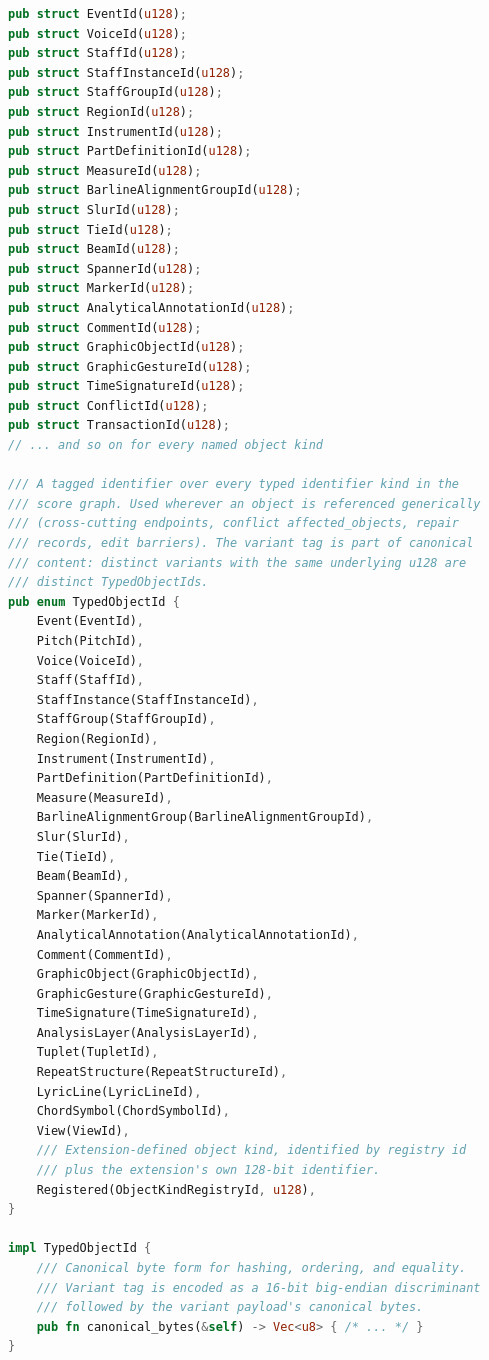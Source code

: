 \documentclass[11pt,letterpaper]{report}
\begin{document}
\begin{lstlisting}[language=Rust]
pub struct EventId(u128);
pub struct VoiceId(u128);
pub struct StaffId(u128);
pub struct StaffInstanceId(u128);
pub struct StaffGroupId(u128);
pub struct RegionId(u128);
pub struct InstrumentId(u128);
pub struct PartDefinitionId(u128);
pub struct MeasureId(u128);
pub struct BarlineAlignmentGroupId(u128);
pub struct SlurId(u128);
pub struct TieId(u128);
pub struct BeamId(u128);
pub struct SpannerId(u128);
pub struct MarkerId(u128);
pub struct AnalyticalAnnotationId(u128);
pub struct CommentId(u128);
pub struct GraphicObjectId(u128);
pub struct GraphicGestureId(u128);
pub struct TimeSignatureId(u128);
pub struct ConflictId(u128);
pub struct TransactionId(u128);
// ... and so on for every named object kind

/// A tagged identifier over every typed identifier kind in the
/// score graph. Used wherever an object is referenced generically
/// (cross-cutting endpoints, conflict affected_objects, repair
/// records, edit barriers). The variant tag is part of canonical
/// content: distinct variants with the same underlying u128 are
/// distinct TypedObjectIds.
pub enum TypedObjectId {
    Event(EventId),
    Pitch(PitchId),
    Voice(VoiceId),
    Staff(StaffId),
    StaffInstance(StaffInstanceId),
    StaffGroup(StaffGroupId),
    Region(RegionId),
    Instrument(InstrumentId),
    PartDefinition(PartDefinitionId),
    Measure(MeasureId),
    BarlineAlignmentGroup(BarlineAlignmentGroupId),
    Slur(SlurId),
    Tie(TieId),
    Beam(BeamId),
    Spanner(SpannerId),
    Marker(MarkerId),
    AnalyticalAnnotation(AnalyticalAnnotationId),
    Comment(CommentId),
    GraphicObject(GraphicObjectId),
    GraphicGesture(GraphicGestureId),
    TimeSignature(TimeSignatureId),
    AnalysisLayer(AnalysisLayerId),
    Tuplet(TupletId),
    RepeatStructure(RepeatStructureId),
    LyricLine(LyricLineId),
    ChordSymbol(ChordSymbolId),
    View(ViewId),
    /// Extension-defined object kind, identified by registry id
    /// plus the extension's own 128-bit identifier.
    Registered(ObjectKindRegistryId, u128),
}

impl TypedObjectId {
    /// Canonical byte form for hashing, ordering, and equality.
    /// Variant tag is encoded as a 16-bit big-endian discriminant
    /// followed by the variant payload's canonical bytes.
    pub fn canonical_bytes(&self) -> Vec<u8> { /* ... */ }
}
\end{lstlisting}
\end{document}
